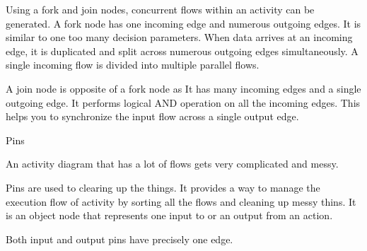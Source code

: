 \documentclass[12pt]{report}
\renewcommand{\_}{\kern-1.5pt\textunderscore\kern-1.5pt}
\begin{document}
\begin{adjustwidth}{0.2in}{0.84in}
\textcolor[HTML]{0D0D0D}{Using a fork and join nodes, concurrent flows within an activity can be generated. A fork node has one incoming edge and numerous outgoing edges. It is similar to one too many decision parameters. When data arrives at an incoming edge, it is duplicated and split across numerous outgoing edges simultaneously. A single incoming flow is divided into multiple parallel flows.}\par

\end{adjustwidth}

\begin{adjustwidth}{0.2in}{0.84in}
\textcolor[HTML]{0D0D0D}{A join node is opposite of a fork node as It has many incoming edges and a single outgoing edge. It performs logical AND operation on all the incoming edges. This helps you to synchronize the input flow across a single output edge.}\par

\end{adjustwidth}

\begin{adjustwidth}{0.2in}{0.84in}
\textcolor[HTML]{0D0D0D}{Pins}\par

\end{adjustwidth}

\begin{adjustwidth}{0.2in}{0.84in}
\textcolor[HTML]{0D0D0D}{An activity diagram that has a lot of flows gets very complicated and messy.}\par

\end{adjustwidth}

\begin{adjustwidth}{0.2in}{0.84in}
\textcolor[HTML]{0D0D0D}{Pins are used to clearing up the things. It provides a way to manage the execution flow of activity by sorting all the flows and cleaning up messy thins. It is an object node that represents one input to or an output from an action.}\par

\end{adjustwidth}

\begin{adjustwidth}{0.2in}{0.84in}
\textcolor[HTML]{0D0D0D}{Both input and output pins have precisely one edge.}\par

\end{adjustwidth}
\end{document}
